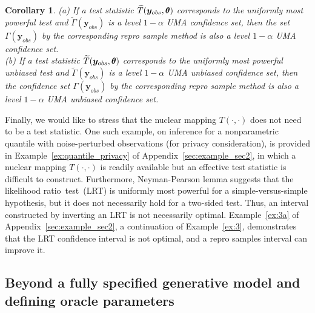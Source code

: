 \documentclass[12pt]{article}
\theoremstyle{shortspace}
\newtheorem{corollary}{Corollary}
\def\*#1{\bm{#1}}
\def\btheta{\mathop{\theta\kern-.45em\hbox{$\theta$}}\nolimits}
\begin{document}
\begin{corollary}\label{cor:UMA-NP}
(a) If a test statistic $\widetilde T(\*y_{obs}, \btheta)$  corresponds to the uniformly most powerful test and  $\widetilde \Gamma(\*y_{obs})$ is a level $1 - \alpha$ UMA confidence set, then the set $\Gamma(\*y_{obs})$ by the corresponding repro sample method is also a level $1 - \alpha$ UMA confidence set. \\
(b) If a test statistic $\widetilde T(\*y_{obs}, \btheta)$ corresponds to the uniformly most powerful unbiased test and  $\widetilde \Gamma(\*y_{obs})$ is a level $1 - \alpha$ UMA unbiased confidence set, then the confidence set $\Gamma(\*y_{obs})$ by the corresponding repro sample method is also a level $1 - \alpha$ UMA unbiased confidence set.
\end{corollary}

Finally, we would like to 
stress that the nuclear mapping $T(\cdot, \cdot)$ does not need to be a test statistic.
One such example, on inference for a nonparametric quantile with noise-perturbed observations (for privacy consideration), is provided in Example~\ref{ex:quantile_privacy} of Appendix~\ref{sec:example_sec2}, in which a nuclear mapping $T(\cdot, \cdot)$ is readily available but an effective test statistic is difficult to construct. 
Furthermore, Neyman-Pearson lemma suggests that the likelihood ratio~test~(LRT) is uniformly most powerful for a simple-versus-simple hypothesis, but it does not necessarily hold for a two-sided test. Thus, an interval constructed by inverting an LRT is not necessarily optimal. Example~\ref{ex:3a} of Appendix~\ref{sec:example_sec2}, a continuation of Example~\ref{ex:3}, demonstrates that the LRT confidence interval is not optimal, and a repro samples interval can improve it.




\subsection{Beyond a fully specified generative model and defining oracle parameters} \label{sec: extendedsetup}
\end{document}
